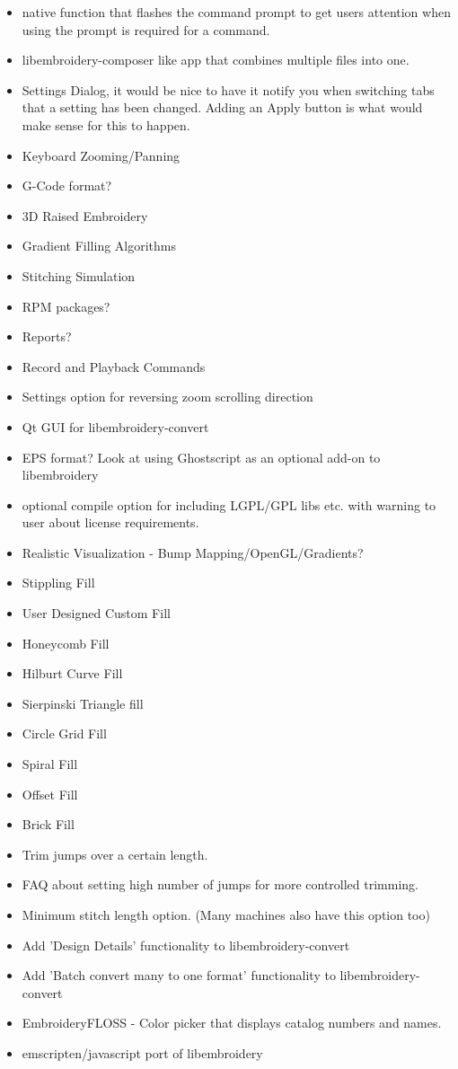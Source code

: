 \documentclass[10pt]{report}
\begin{document}
\begin{itemize}
\item native function that flashes the command prompt to get users attention when
    using the prompt is required for a command.
\item libembroidery-composer like app that combines multiple files into one.
\item Settings Dialog, it would be nice to have it notify you when switching tabs that
    a setting has been changed. Adding an Apply button is what would make sense for
    this to happen.
\item Keyboard Zooming/Panning
\item G-Code format?
\item 3D Raised Embroidery
\item Gradient Filling Algorithms
\item Stitching Simulation
\item RPM packages?
\item Reports?
\item Record and Playback Commands
\item Settings option for reversing zoom scrolling direction
\item Qt GUI for libembroidery-convert
\item EPS format? Look at using Ghostscript as an optional add-on to libembroidery
\item optional compile option for including LGPL/GPL libs etc. with warning to user
    about license requirements.
\item Realistic Visualization - Bump Mapping/OpenGL/Gradients?
\item Stippling Fill
\item User Designed Custom Fill
\item Honeycomb Fill
\item Hilburt Curve Fill
\item Sierpinski Triangle fill
\item Circle Grid Fill
\item Spiral Fill
\item Offset Fill
\item Brick Fill
\item Trim jumps over a certain length.
\item FAQ about setting high number of jumps for more controlled trimming.
\item Minimum stitch length option. (Many machines also have this option too)
\item Add 'Design Details' functionality to libembroidery-convert
\item Add 'Batch convert many to one format' functionality to libembroidery-convert
\item EmbroideryFLOSS - Color picker that displays catalog numbers and names.
\item emscripten/javascript port of libembroidery
\end{itemize}
\end{document}
